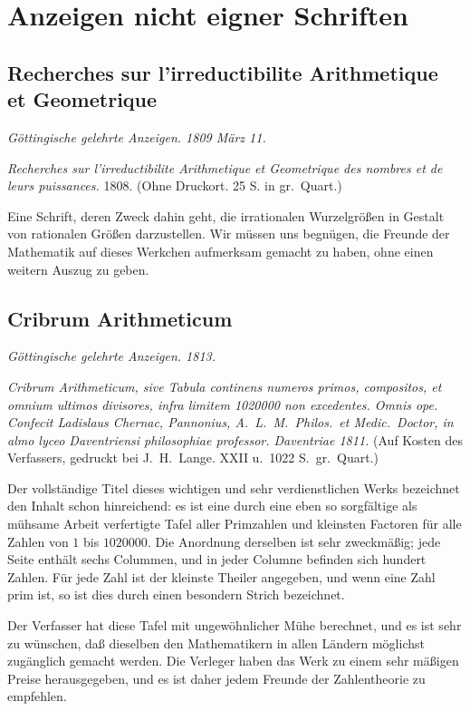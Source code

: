 \documentclass[12pt,a4paper]{article}
\theoremstyle{plain}
\theoremstyle{definition}
\theoremstyle{remark}
\begin{document}
\section*{Anzeigen nicht eigner Schriften}

\subsection*{Recherches sur l'irreductibilite Arithmetique et Geometrique}

\textit{Göttingische gelehrte Anzeigen. 1809 März 11.}

\textit{Recherches sur l'irreductibilite Arithmetique et Geometrique des nombres et de leurs puissances.} 1808. (Ohne Druckort. 25 S. in gr.\ Quart.)

Eine Schrift, deren Zweck dahin geht, die irrationalen Wurzelgrößen in Gestalt von rationalen Größen darzustellen. Wir müssen uns begnügen, die Freunde der Mathematik auf dieses Werkchen aufmerksam gemacht zu haben, ohne einen weitern Auszug zu geben.

\subsection*{Cribrum Arithmeticum}

\textit{Göttingische gelehrte Anzeigen. 1813.}

\textit{Cribrum Arithmeticum, sive Tabula continens numeros primos, compositos, et omnium ultimos divisores, infra limitem 1020000 non excedentes. Omnis ope. Confecit Ladislaus Chernac, Pannonius, A.\ L.\ M.\ Philos.\ et Medic.\ Doctor, in almo lyceo Daventriensi philosophiae professor. Daventriae 1811.} (Auf Kosten des Verfassers, gedruckt bei J.\ H.\ Lange. XXII u.\ 1022 S.\ gr.\ Quart.)

Der vollständige Titel dieses wichtigen und sehr verdienstlichen Werks bezeichnet den Inhalt schon hinreichend: es ist eine durch eine eben so sorgfältige als mühsame Arbeit verfertigte Tafel aller Primzahlen und kleinsten Factoren für alle Zahlen von $1$ bis $1020000$. Die Anordnung derselben ist sehr zweckmäßig; jede Seite enthält sechs Colummen, und in jeder Columne befinden sich hundert Zahlen. Für jede Zahl ist der kleinste Theiler angegeben, und wenn eine Zahl prim ist, so ist dies durch einen besondern Strich bezeichnet.

Der Verfasser hat diese Tafel mit ungewöhnlicher Mühe berechnet, und es ist sehr zu wünschen, daß dieselben den Mathematikern in allen Ländern möglichst zugänglich gemacht werden. Die Verleger haben das Werk zu einem sehr mäßigen Preise herausgegeben, und es ist daher jedem Freunde der Zahlentheorie zu empfehlen.
\end{document}
